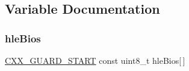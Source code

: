 \subsection{Variable Documentation}
\mbox{\label{hle-bios_8h_af15b38ffe83c549fd7f536f907479852}} 
\subsubsection{\texorpdfstring{hle\+Bios}{hleBios}}
{\footnotesize\ttfamily \mbox{\hyperlink{__builder_8h_af721f4bd9a2c3267a89d3967b3ca1747}{C\+X\+X\+\_\+\+G\+U\+A\+R\+D\+\_\+\+S\+T\+A\+RT}} const uint8\+\_\+t hle\+Bios\mbox{[}$\,$\mbox{]}}

